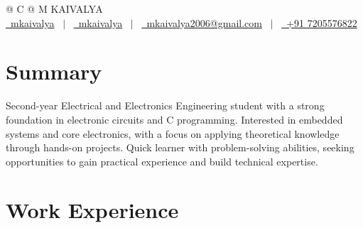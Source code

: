 \documentclass[a4paper,12pt]{article}
\begin{document}
\pagestyle{empty} 



\begin{tabularx}{\linewidth}{@{} C @{}}
\Huge{M KAIVALYA} \\[7.5pt]
\href{https://github.com/mkaivalya}{\raisebox{-0.05\height}\faGithub\ mkaivalya} \ $|$ \ 
\href{https://www.linkedin.com/in/m-kaivalya-68a292313}{\raisebox{-0.05\height}\faLinkedin\ mkaivalya} \ $|$ \ 
\href{mailto:mkaivalya2006@gmail.com}{\raisebox{-0.05\height}\faEnvelope \ mkaivalya2006@gmail.com} \ $|$ \ 
\href{tel:+917205576822}{\raisebox{-0.05\height}\faMobile \ +91 7205576822} \\
\end{tabularx}


\section{Summary}
Second-year Electrical and Electronics Engineering student with a strong foundation in electronic circuits and C programming. Interested in embedded systems and core electronics, with a focus on applying theoretical knowledge through hands-on projects. Quick learner with problem-solving abilities, seeking opportunities to gain practical experience and build technical expertise.

\section{Work Experience}
\end{document}
